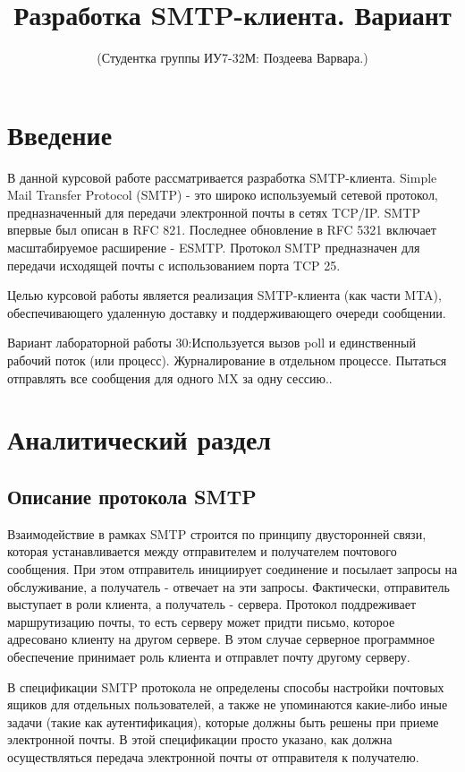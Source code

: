 \documentclass[a4paper,12pt]{report}
\title{Разработка SMTP-клиента. Вариант \textnumero 30}
\author{(Студентка группы ИУ7-32М: Поздеева Варвара.)}
\begin{document}
	\maketitle
	\tableofcontents

	\chapter*{Введение}
	В данной курсовой работе рассматривается разработка SMTP-клиента. Simple Mail Transfer Protocol (SMTP) - это широко используемый сетевой протокол, предназначенный для передачи электронной почты в сетях TCP/IP. SMTP впервые был описан в RFC 821. Последнее обновление в RFC 5321 включает масштабируемое расширение - ESMTP. Протокол SMTP предназначен для передачи исходящей почты с использованием порта TCP 25.

	Целью курсовой работы является реализация SMTP-клиента (как части MTA), обеспечивающего удаленную доставку и поддерживающего очереди сообщении.
	
	Вариант лабораторной работы 30:Используется вызов poll и единственный рабочий поток (или процесс). Журналирование в отдельном процессе. Пытаться отправлять все сообщения для одного MX за одну сессию..

	\chapter{Аналитический раздел}

	\section{Описание протокола SMTP}

	 Взаимодействие в рамках SMTP строится по принципу двусторонней связи, которая устанавливается между отправителем и получателем почтового сообщения. При этом отправитель инициирует соединение и посылает запросы на обслуживание, а получатель - отвечает на эти запросы. Фактически, отправитель выступает в роли клиента, а получатель - сервера. Протокол поддреживает маршрутизацию почты, то есть серверу может придти письмо, которое адресовано клиенту на другом сервере. В этом случае серверное программное обеспечение принимает роль клиента и отправлет почту другому серверу. 
	 
	 В спецификации SMTP протокола не определены способы настройки почтовых ящиков для отдельных пользователей, а также не упоминаются какие-либо иные задачи (такие как аутентификация), которые должны быть решены при приеме электронной почты. В этой спецификации просто указано, как должна осуществляться передача электронной почты от отправителя к получателю.
\end{document}
